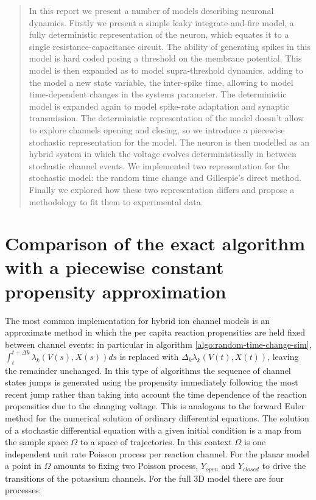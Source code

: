 \begin{abstract}
	In this report we present a number of models describing neuronal dynamics.
	Firstly we present a simple leaky integrate-and-fire model, a fully deterministic representation of the neuron, which equates it to a single resistance-capacitance circuit.
	The ability of generating spikes in this model is hard coded posing a threshold on the membrane potential.
	This model is then expanded as to model supra-threshold dynamics, adding to the model a new state variable, the inter-spike time, allowing to model time-dependent changes in the systems parameter.
	The deterministic model is expanded again to model spike-rate adaptation and synaptic transmission.
	The deterministic representation of the model doesn't allow to explore channels opening and closing, so we introduce a piecewise stochastic representation for the model.
	The neuron is then modelled as an hybrid system in which the voltage evolves deterministically in between stochastic channel events.
	We implemented two representation for the stochastic model: the random time change and Gillespie's direct method.
	Finally we explored how these two representation differs and propose a methodology to fit them to experimental data.
\end{abstract}










\section{Comparison of the exact algorithm with a piecewise constant propensity approximation}
\label{section:comparison}
The most common implementation for hybrid ion channel models is an approximate method in which the per capita reaction propensities are held fixed between channel events: in particular in algorithm \ref{algo:random-time-change-sim}, $\int_t^{t+\Delta k}\lambda_k(V(s), X(s))ds$ is replaced with $\Delta_k\lambda_k(V(t), X(t))$, leaving the remainder unchanged.
In this type of algorithms the sequence of channel states jumps is generated using the propensity immediately following the most recent jump rather than taking into account the time dependence of the reaction propensities due to the changing voltage.
This is analogous to the forward Euler method for the numerical solution of ordinary differential equations.
The solution of a stochastic differential equation with a given initial condition is a map from the sample space $\Omega$ to a space of trajectories.
In this context $\Omega$ is one independent unit rate Poisson process per reaction channel.
For the planar model a point in $\Omega$ amounts to fixing two Poisson process, $Y_{open}$ and $Y_{closed}$ to drive the transitions of the potassium channels.
For the full 3D model there are four processes:

